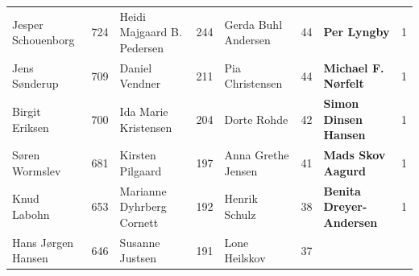 \begin{table}[h]
\begin{tabular}{l|c|l|c|l|c|l|c}
		Jesper Schouenborg & 724 & Heidi Majgaard B. Pedersen & 244 & Gerda Buhl Andersen & 44 & \textbf{Per Lyngby} & 1 \\
		Jens Sønderup & 709 & Daniel Vendner & 211 & Pia Christensen & 44 & \textbf{Michael F. Nørfelt} & 1 \\
		Birgit Eriksen & 700 & Ida Marie Kristensen & 204 & Dorte Rohde & 42 & \textbf{Simon Dinsen Hansen} & 1 \\
		Søren Wormslev & 681 & Kirsten Pilgaard & 197 & Anna Grethe Jensen & 41 & \textbf{Mads Skov Aagurd} & 1 \\
		Knud Labohn & 653 & Marianne Dyhrberg Cornett & 192 & Henrik Schulz & 38 & \textbf{Benita Dreyer-Andersen} & 1 \\
		Hans Jørgen Hansen & 646 & Susanne Justsen & 191 & Lone Heilskov & 37 & & \\
		\bottomrule
	\end{tabular}
\end{table}
